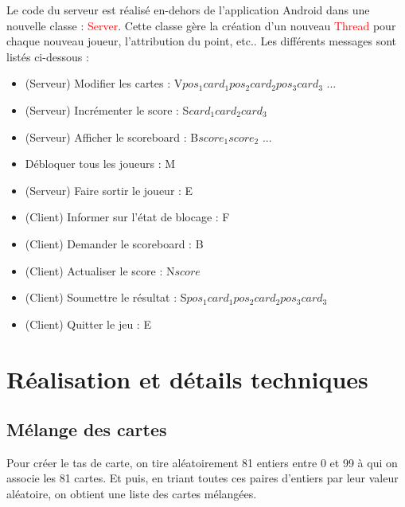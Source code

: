 \documentclass[paper=a4, french]{scrartcl} %
\newcommand{\class}[1]{\colorbox{bg}{\textcolor{red}{\usefont{OT1}{cmtt}{m}{n}#1}}}
\begin{document}
Le code du serveur est réalisé en-dehors de l'application Android dans une nouvelle classe : \class{Server}. Cette classe gère la création d'un nouveau \class{Thread} pour chaque nouveau joueur, l'attribution du point, etc.. Les différents messages sont listés ci-dessous : 

\begin{itemize}
\item (Serveur) Modifier les cartes : V{\textvisiblespace}$pos_1${\textvisiblespace}$card_1${\textvisiblespace }$pos_2${\textvisiblespace}$card_2${\textvisiblespace}$pos_3${\textvisiblespace}$card_3$ ...
\item (Serveur) Incrémenter le score : S{\textvisiblespace}$card_1${\textvisiblespace}$card_2${\textvisiblespace}$card_3$
\item (Serveur) Afficher le scoreboard : B{\textvisiblespace}$score_1${\textvisiblespace}$score_2$ ...
\item Débloquer tous les joueurs : M
\item (Serveur) Faire sortir le joueur : E
\item (Client) Informer sur l'état de blocage : F
\item (Client) Demander le scoreboard : B
\item (Client) Actualiser le score : N{\textvisiblespace}$score$
\item (Client) Soumettre le résultat : S{\textvisiblespace}$pos_1${\textvisiblespace}$card_1${\textvisiblespace }$pos_2${\textvisiblespace}$card_2${\textvisiblespace}$pos_3${\textvisiblespace}$card_3$
\item (Client) Quitter le jeu : E
\end{itemize}



\section{Réalisation et détails techniques}


\subsection{Mélange des cartes}
Pour créer le tas de carte, on tire aléatoirement 81 entiers entre 0 et 99 à qui on associe les 81 cartes. Et puis, en triant toutes ces paires d'entiers par leur valeur aléatoire, on obtient une liste des cartes mélangées. 
	
\end{document}
